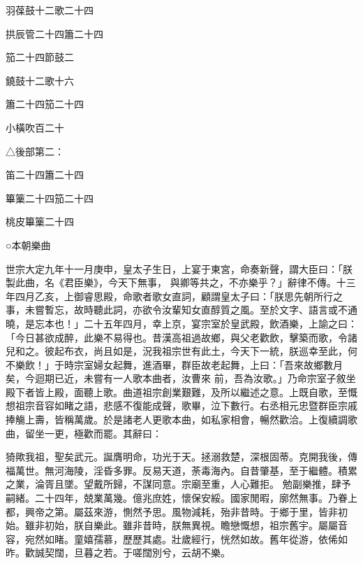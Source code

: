 \begin{pinyinscope}
 羽葆鼓十二歌二十四



 拱辰管二十四簫二十四



 笳二十四節鼓二



 鐃鼓十二歌十六



 簫二十四笳二十四



 小橫吹百二十



 △後部第二：



 笛二十四簫二十四



 篳篥二十四笳二十四



 桃皮篳篥二十四



 ○本朝樂曲



 世宗大定九年十一月庚申，皇太子生日，上宴于東宮，命奏新聲，謂大臣曰：「朕製此曲，名《君臣樂》，今天下無事，
 與卿等共之，不亦樂乎？」辭律不傳。十三年四月乙亥，上御睿思殿，命歌者歌女直詞，顧謂皇太子曰：「朕思先朝所行之事，未嘗暫忘，故時聽此詞，亦欲令汝輩知女直醇質之風。至於文字、語言或不通曉，是忘本也！」二十五年四月，幸上京，宴宗室於皇武殿，飲酒樂，上諭之曰：「今日甚欲成醉，此樂不易得也。昔漢高祖過故鄉，與父老歡飲，擊築而歌，令諸兒和之。彼起布衣，尚且如是，況我祖宗世有此土，今天下一統，朕巡幸至此，何不樂飲！」于時宗室婦女起舞，進酒畢，群臣故老起舞，上曰：「吾來故鄉數月矣，今迴期已近，未嘗有一人歌本曲者，汝曹來
 前，吾為汝歌。」乃命宗室子敘坐殿下者皆上殿，面聽上歌。曲道祖宗創業艱難，及所以繼述之意。上既自歌，至慨想祖宗音容如睹之語，悲感不復能成聲，歌畢，泣下數行。右丞相元忠暨群臣宗戚捧觴上壽，皆稱萬歲。於是諸老人更歌本曲，如私家相會，暢然歡洽。上復續調歌曲，留坐一更，極歡而罷。其辭曰：



 猗歟我祖，聖矣武元。誕膺明命，功光于天。拯溺救楚，深根固蒂。克開我後，傳福萬世。無河海陵，淫昏多罪。反易天道，荼毒海內。自昔肇基，至于繼體。積累之業，淪胥且墜。望戴所歸，不謀同意。宗廟至重，人心難拒。
 勉副樂推，肆予嗣緒。二十四年，兢業萬幾。億兆庶姓，懷保安綏。國家閒暇，廓然無事。乃眷上都，興帝之第。屬茲來游，惻然予思。風物減耗，殆非昔時。于鄉于里，皆非初始。雖非初始，朕自樂此。雖非昔時，朕無異視。瞻戀慨想，祖宗舊宇。屬屬音容，宛然如睹。童嬉孺慕，歷歷其處。壯歲經行，恍然如故。舊年從游，依俙如昨。歡誠契闊，旦暮之若。于嗟闊別兮，云胡不樂。




\end{pinyinscope}
